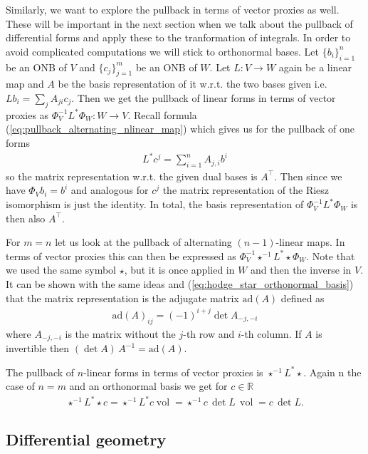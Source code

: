 \documentclass[12pt,a4paper]{article}
\numberwithin{equation}{subsection}
\numberwithin{lemma}{subsection}
\theoremstyle{definition}
\DeclareMathOperator{\vol}{vol}
\newcommand{\real}{\mathbb{R}}
\begin{document}
Similarly, we want to explore the pullback in terms of vector proxies as well. 
These will be important in the next section when we talk about the pullback 
of differential forms and apply these to the tranformation of integrals.
In order to avoid complicated computations we will stick to orthonormal bases.
Let $\{ b_i \}_{i=1}^n$ be an ONB of $V$ and 
$\{ c_j \}_{j=1}^m$ be an ONB of $W$. Let $L : V \rightarrow W$ 
again be a linear map and $A$ be the basis representation of it w.r.t. 
the two bases given i.e. $L b_i = \sum_j A_{ji} c_j$. 
Then we get the pullback of linear forms in terms 
of vector proxies 
as $\Phi_V^{-1} L^* \Phi_W : W \rightarrow V$. Recall 
formula (\ref{eq:pullback_alternating_nlinear_map}) which 
gives us for the pullback of one forms 
\begin{align}
    L^* c^j = \sum_{i=1}^n A_{j,i} b^i \label{eq:pullback_linear_forms}
\end{align}
so the matrix representation w.r.t. the given dual bases is $A^\top$.
Then since we have $\Phi_V b_i = b^i$ and analogous for $c^j$
the matrix representation of the Riesz isomorphism is just the identity.
In total, the basis representation of $\Phi_V^{-1} L^* \Phi_W$ is then also 
$A^\top$.

For $m=n$ let us look at the pullback of alternating $(n-1)$-linear maps.
In terms of vector proxies this can then be expressed as 
$\Phi_V^{-1} \star^{-1} L^* \star \Phi_W$. Note that we used the same symbol 
$\star$, but it is once applied in $W$ and then the inverse in $V$. It 
can be shown with the same ideas and (\ref{eq:hodge_star_orthonormal_basis})
that the matrix representation is the adjugate matrix 
$\text{ad}(A)$ defined as 
\begin{align*}
    \text{ad}(A)_{ij} = (-1)^{i+j} \det A_{-j,-i}
\end{align*} 
where $A_{-j,-i}$ is the matrix without the $j$-th row and $i$-th column.
If $A$ is invertible then $(\det A)\,A^{-1} =  \text{ad}(A)$. 

The pullback of $n$-linear forms in terms of vector proxies is 
$\star^{-1} L^* \star$. Again n the case of $n=m$ and an 
orthonormal basis we get for $c \in \real$
\begin{align*}
    \star^{-1} L^* \star c = \star^{-1} L^* c \vol 
    = \star^{-1} c\,\det L \,\vol = c\,\det L.
\end{align*}

\subsection{Differential geometry}\label{sec:differential_geometry}
\end{document}
